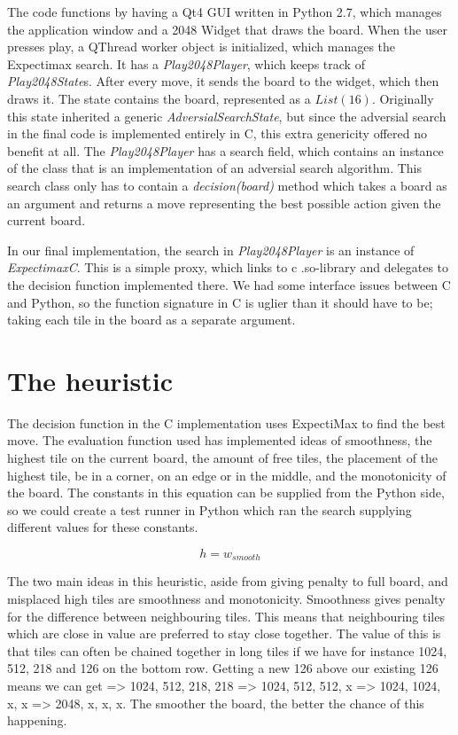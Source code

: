 The code functions by having a Qt4 GUI written in Python 2.7, which
manages the application window and a 2048 Widget that draws the board.
When the user presses play, a QThread worker object is initialized, which
manages the Expectimax search. It has a \emph{Play2048Player}, which keeps track of
\emph{Play2048State}s. After every move, it sends the board to the widget, which then draws it.
The state contains the board, represented as a \(List(16)\). Originally this
state inherited a generic \emph{AdversialSearchState}, but since the adversial
search in the final code is implemented entirely in C, this extra
genericity offered no benefit at all. The \emph{Play2048Player} has a search field, which
contains an instance of the class that is an implementation of an adversial search algorithm. This
search class only has to contain a \emph{decision(board)} method which takes a board
as an argument and returns a move representing the best possible action
given the current board.

In our final implementation, the search in \emph{Play2048Player} is an instance of
\emph{ExpectimaxC}. This is a simple proxy, which links to c .so-library and delegates
to the decision function implemented there. We had some interface issues between
C and Python, so the function signature in C is uglier than it should have to
be; taking each tile in the board as a separate argument.



\section{The heuristic}

The decision function in the C implementation uses ExpectiMax to find the best move.
The evaluation function used has implemented ideas of smoothness, the highest tile
on the current board, the amount of free tiles, the placement of the highest tile,
be in a corner, on an edge or in the middle, and the monotonicity of the board.
The constants in this equation can be supplied from the Python side, so we
could create a test runner in Python which ran the search supplying different
values for these constants.

\begin{equation}
	h = w_{smooth}  
\end{equation}

The two main ideas in this heuristic, aside from giving penalty to full board, and
misplaced high tiles are smoothness and monotonicity. Smoothness gives penalty
for the difference between neighbouring tiles. This means that neighbouring tiles
which are close in value are preferred to stay close together. The value of this is
that tiles can often be chained together in long tiles if we have for instance
1024, 512, 218 and 126 on the bottom row. Getting a new 126 above our existing 126
means we can get => 1024, 512, 218, 218 => 1024, 512, 512, x => 1024, 1024, x, x =>
2048, x, x, x. The smoother the board, the better the chance of this happening.

